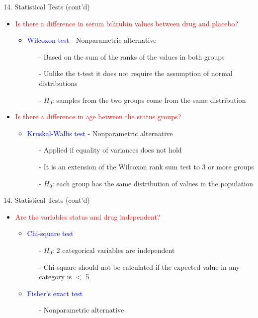 \documentclass[14pt, aspectratio=169, sectionpage=simple, xclolor=table]{beamer}
\begin{document}
\begin{frame}[fragile]{14. Statistical Tests (cont'd)}
\begin{itemize}
\item \textcolor{red}{Is there a difference in serum bilirubin values between drug and placebo?}
\begin{itemize}
\item \textcolor{blue}{Wilcoxon test} -  Nonparametric alternative
\begin{itemize}
\item[-] Based on the sum of the ranks of the values in both groups
\item[-] Unlike the t-test it does not require the assumption of normal distributions
\item[-] $H_0$: samples from the two groups come from the same distribution
\end{itemize}
\end{itemize}
\item \textcolor{red}{Is there a difference in age between the status groups?}
\begin{itemize}
\item \textcolor{blue}{Kruskal-Wallis test} -  Nonparametric alternative
\begin{itemize}
\item[-] Applied if equality of variances does not hold
\item[-] It is an extension of the Wilcoxon rank sum test to 3 or more groups
\item[-] $H_0$: each group has the same distribution of values in the population
\end{itemize}
\end{itemize}
\end{itemize}
\end{frame}
\begin{frame}[fragile]{14. Statistical Tests (cont'd)}
\begin{itemize}
\item \textcolor{red}{Are the variables status and drug independent?}
\begin{itemize}
\item \textcolor{blue}{Chi-square test}
\begin{itemize}
\item[-] $H_0$: 2 categorical variables are independent
\item[-] Chi-square should not be calculated if the expected value in any category is $<$ 5
\vspace{1ex}
\vspace{1ex}
\end{itemize}
\item \textcolor{blue}{Fisher's exact test} 
\begin{itemize}
\item[-] Nonparametric alternative
\end{itemize}
\end{itemize}
\end{itemize}
\end{frame}
\end{document}
